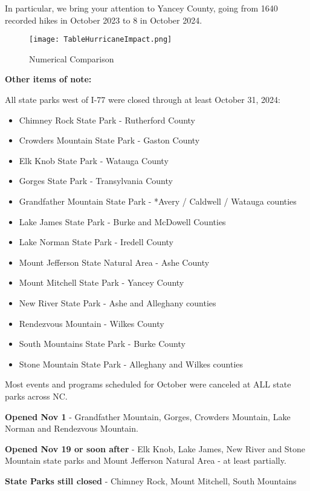 \documentclass[12pt]{article}
\begin{document}
In particular, we bring your attention to Yancey County, going from 1640 recorded hikes in October 2023 to 8 in October 2024.

\begin{figure}[H]
    \centering
    \texttt{[image: TableHurricaneImpact.png]}
    \caption{Numerical Comparison}
    \label{fig:enter-label}
\end{figure}

\newpage

\textbf{Other items of note:}

All state parks west of I-77 were closed through at least October 31, 2024:
\begin{itemize}
    \item Chimney Rock State Park - Rutherford County
    \item Crowders Mountain State Park - Gaston County
    \item Elk Knob State Park - Watauga County
    \item Gorges State Park - Transylvania County
    \item Grandfather Mountain State Park -  *Avery / Caldwell / Watauga counties
    \item Lake James State Park - Burke and McDowell Counties
    \item Lake Norman State Park - Iredell County
    \item Mount Jefferson State Natural Area - Ashe County
    \item Mount Mitchell State Park - Yancey County
    \item New River State Park - Ashe and Alleghany counties
    \item Rendezvous Mountain - Wilkes County
    \item South Mountains State Park - Burke County
    \item Stone Mountain State Park - Alleghany and Wilkes counties
\end{itemize}

Most events and programs scheduled for October were canceled at ALL state parks across NC.

\textbf{Opened Nov 1} - Grandfather Mountain, Gorges, Crowders Mountain, Lake Norman and Rendezvous Mountain.

\textbf{Opened Nov 19 or soon after} - Elk Knob, Lake James, New River and Stone Mountain state parks and Mount Jefferson Natural Area - at least partially. 

\textbf{State Parks still closed} - Chimney Rock, Mount Mitchell, South Mountains
\end{document}
